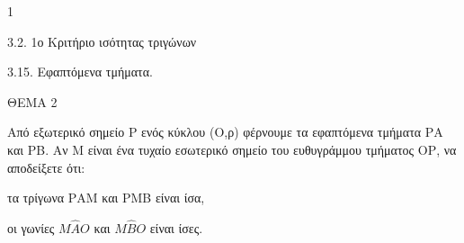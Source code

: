 \begin{ylh}{1}
    \item 3.2. 1ο Κριτήριο ισότητας τριγώνων
    \item 3.15. Εφαπτόμενα τμήματα.
\end{ylh}

ΘΕΜΑ 2

Από εξωτερικό σημείο Ρ ενός κύκλου (Ο,ρ) φέρνουμε τα εφαπτόμενα τμήματα ΡΑ και ΡΒ. Αν Μ είναι ένα τυχαίο εσωτερικό σημείο του ευθυγράμμου τμήματος ΟΡ, να αποδείξετε ότι:

\begin{alist}
\item τα τρίγωνα ΡΑΜ και PMB είναι ίσα, 

\item οι γωνίες $Μ\widehat{Α}Ο$ και $Μ\widehat{Β}Ο$ είναι ίσες. 


\begin{center}
\end{center}
\end{alist}
